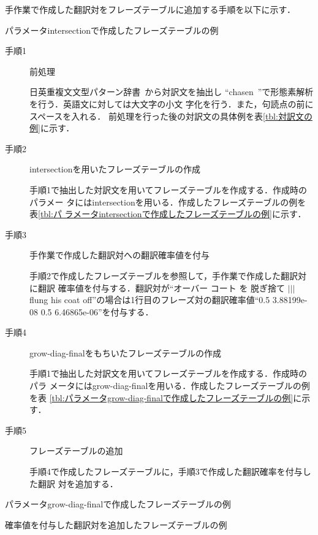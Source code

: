 \documentclass[japanese]{jnlp_1.4}
\begin{document}
手作業で作成した翻訳対をフレーズテーブルに追加する手順を以下に示す．

\begin{table}[t]
\caption{パラメータintersectionで作成したフレーズテーブルの例}
\label{tbl:パラメータintersectionで作成したフレーズテーブルの例}

\end{table}

\begin{description}

\item[手順1] 前処理

日英重複文文型パターン辞書~\cite{tori}から対訳文を抽出し
``chasen~\cite{chasen}''で形態素解析を行う．英語文に対しては大文字の小文
字化を行う．また，句読点の前にスペースを入れる．
前処理を行った後の対訳文の具体例を表\ref{tbl:対訳文の例}に示す．

\item[手順2] intersectionを用いたフレーズテーブルの作成

手順1で抽出した対訳文を用いてフレーズテーブルを作成する．作成時のパラメー
タにはintersectionを用いる．作成したフレーズテーブルの例を表\ref{tbl:パ
ラメータintersectionで作成したフレーズテーブルの例}に示す．

\item[手順3] 手作業で作成した翻訳対への翻訳確率値を付与

手順2で作成したフレーズテーブルを参照して，手作業で作成した翻訳対に翻訳
確率値を付与する．翻訳対が``オーバー コート を 脱ぎ捨て $|||$ flung his coat
off''の場合は1行目のフレーズ対の翻訳確率値``0.5 3.88199e-08 0.5
6.46865e-06''を付与する．


\item[手順4] grow-diag-finalをもちいたフレーズテーブルの作成

手順1で抽出した対訳文を用いてフレーズテーブルを作成する．作成時のパラ
メータにはgrow-diag-finalを用いる．作成したフレーズテーブルの例を表
\ref{tbl:パラメータgrow-diag-finalで作成したフレーズテーブルの例}に示す．

\item[手順5] フレーズテーブルの追加

\pagebreak
手順4で作成したフレーズテーブルに，手順3で作成した翻訳確率を付与した翻訳
対を追加する．

\end{description} 

\begin{table}[t]
\caption{パラメータgrow-diag-finalで作成したフレーズテーブルの例}
\label{tbl:パラメータgrow-diag-finalで作成したフレーズテーブルの例}

\end{table}
\begin{table}[t]
\caption{確率値を付与した翻訳対を追加したフレーズテーブルの例}
\label{tbl:確率値を付与した翻訳対を追加したフレーズテーブルの例}

\end{table}
\end{document}
